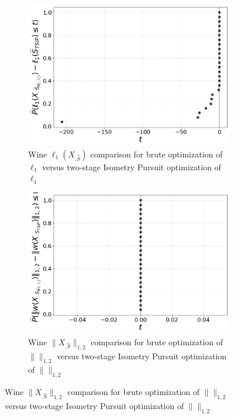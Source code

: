 \begin{figure}[t]
    \vspace{0.5cm}

    \begin{subfigure}[b]{0.45\textwidth}
        \centering
        \includegraphics[width=\textwidth]{../figures/wine_isometry_losses_iso_ecdf}
        \caption{Wine $\ell_1(X_{.\widehat S})$ comparison for brute optimization of $\ell_1$ versus two-stage Isometry Pursuit optimization of $\ell_1$}
        \label{fig:wine_isometry_losses_ecdf}
    \end{subfigure}
    \hfill
    \begin{subfigure}[b]{0.45\textwidth}
        \centering
        \includegraphics[width=\textwidth]{../figures/wine_isometry_losses_ts_ecdf}
        \caption{Wine $\|X_{.\widehat S}\|_{1,2}$ comparison for brute optimization of $\|\|_{1,2}$ versus two-stage Isometry Pursuit optimization of $\|\|_{1,2}$}
        \label{fig:wine_multitask_losses_ecdf}
    \end{subfigure}


\end{figure}
